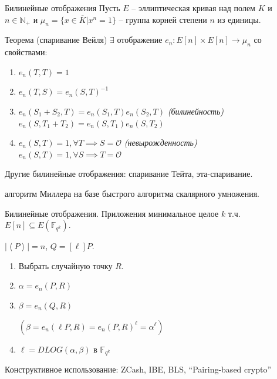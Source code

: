 \documentclass{beamer}
\begin{document}
\begin{frame}{Билинейные отображения}
Пусть $E$ -- эллиптическая кривая над полем $K$ и $n \in \mathbb{N}_{+}$ и $\mu_n = \{x \in \overline{K} | x^n = 1\}$ -- группа корней степени $n$ из единицы.
    
\begin{block}{Теорема (спаривание Вейля)}
$\exists$ отображение
$
e_n: E[n] \times E[n] \rightarrow \mu_n
$
со свойствами:
\begin{enumerate}
\item $e_n(T,T) = 1$
\item $e_n(T,S) = e_n(S,T)^{-1}$
\item $e_n(S_1 + S_2, T) = e_n(S_1, T) e_n(S_2, T)$ \hfill \textit{(билинейность)} \\
$e_n(S, T_1 + T_2) = e_n(S, T_1) e_n(S, T_2)$
\item $e_n(S,T) = 1, \forall T \implies S = \mathcal{O}$ \hfill \textit{(невырожденность)}\\
$e_n(S,T) = 1, \forall S \implies T = \mathcal{O}$
\end{enumerate}
\end{block}

Другие билинейные отображения: спаривание Тейта, эта-спаривание.

\vspace{1em}
 алгоритм Миллера на базе быстрого алгоритма скалярного умножения.

\end{frame}


\begin{frame}{Билинейные отображения. Приложения}
 минимальное целое $k$ т.ч. {\small $E[n] \subseteq E(\mathbb{F}_{q^k})$}.

\vspace{1em}

 $|\left<P\right>| = n$, $Q = [\ell] P$.
    \begin{enumerate}
        \item Выбрать случайную точку $R$.
        \item $\alpha = e_n(P, R)$
        \item $\beta  = e_n(Q, R)$ \hfill 
        \begin{scriptsize}
        $(\beta = e_n(\ell P, R) = e_n(P, R)^\ell = \alpha^\ell)$
        \end{scriptsize}
        \item $\ell = DLOG(\alpha, \beta)$ в $\mathbb{F}_{q^k}$
    \end{enumerate}

\vspace{1em}
Конструктивное использование: ZCash, IBE, BLS, ``Pairing-based crypto''
\end{frame}
\end{document}
